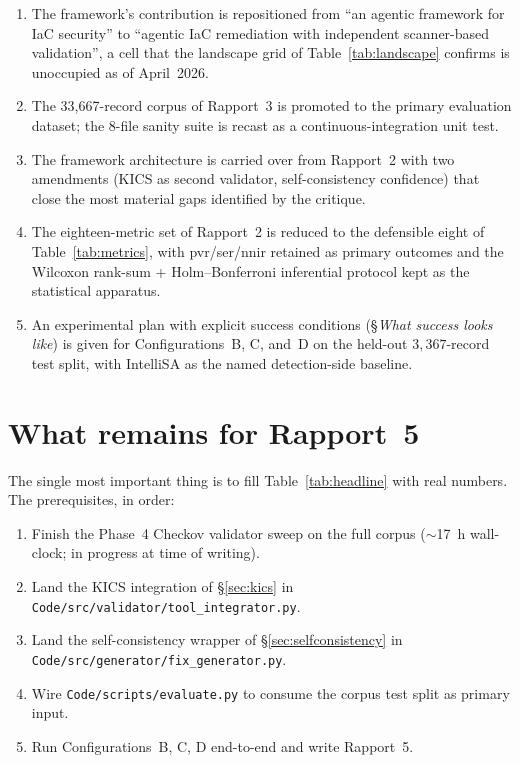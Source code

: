 \documentclass[12pt, a4paper]{report}
\begin{document}
\begin{enumerate}
  \item The framework's contribution is repositioned from ``an agentic
        framework for IaC security'' to ``agentic IaC remediation with
        independent scanner-based validation'', a cell that the
        landscape grid of Table~\ref{tab:landscape} confirms is
        unoccupied as of April~2026.
  \item The 33{,}667-record corpus of Rapport~3 is promoted to the
        primary evaluation dataset; the 8-file sanity suite is recast
        as a continuous-integration unit test.
  \item The framework architecture is carried over from Rapport~2 with
        two amendments (KICS as second validator, self-consistency
        confidence) that close the most material gaps identified by
        the critique.
  \item The eighteen-metric set of Rapport~2 is reduced to the
        defensible eight of Table~\ref{tab:metrics}, with
        \gls{pvr}/\gls{ser}/\gls{nnir} retained as primary outcomes
        and the Wilcoxon rank-sum + Holm--Bonferroni inferential
        protocol kept as the statistical apparatus.
  \item An experimental plan with explicit success conditions
        (\S\emph{What success looks like}) is given for
        Configurations~B, C, and~D on the held-out
        $3{,}367$-record test split, with IntelliSA as the named
        detection-side baseline.
\end{enumerate}

\section{What remains for Rapport~5}

The single most important thing is to fill Table~\ref{tab:headline} with
real numbers. The prerequisites, in order:

\begin{enumerate}
  \item Finish the Phase~4 Checkov validator sweep on the full corpus
        ($\sim$17~h wall-clock; in progress at time of writing).
  \item Land the KICS integration of \S\ref{sec:kics} in
        \texttt{Code/src/validator/tool\_integrator.py}.
  \item Land the self-consistency wrapper of \S\ref{sec:selfconsistency}
        in \texttt{Code/src/generator/fix\_generator.py}.
  \item Wire \texttt{Code/scripts/evaluate.py} to consume the corpus
        test split as primary input.
  \item Run Configurations~B, C, D end-to-end and write Rapport~5.
\end{enumerate}
\end{document}

